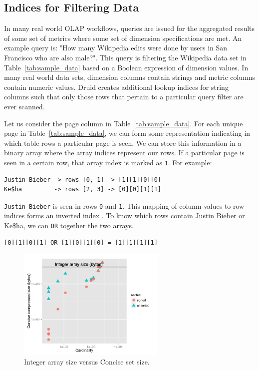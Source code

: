 \documentclass{acm_proc_article-sp}
\begin{document}
\subsection{Indices for Filtering Data}
In many real world OLAP workflows, queries are issued for the aggregated
results of some set of metrics where some set of dimension specifications are
met. An example query is: "How many Wikipedia edits were done by users in
San Francisco who are also male?". This query is filtering the Wikipedia data
set in Table~\ref{tab:sample_data} based on a Boolean expression of dimension
values. In many real world data sets, dimension columns contain strings and
metric columns contain numeric values. Druid creates additional lookup
indices for string columns such that only those rows that pertain to a
particular query filter are ever scanned.

Let us consider the page column in
Table~\ref{tab:sample_data}. For each unique page in
Table~\ref{tab:sample_data}, we can form some representation
indicating in which table rows a particular page is seen. We can
store this information in a binary array where the array indices
represent our rows. If a particular page is seen in a certain
row, that array index is marked as \texttt{1}. For example:
{\small\begin{verbatim}
Justin Bieber -> rows [0, 1] -> [1][1][0][0]
Ke$ha         -> rows [2, 3] -> [0][0][1][1]
\end{verbatim}}

\texttt{Justin Bieber} is seen in rows \texttt{0} and \texttt{1}. This mapping of column values
to row indices forms an inverted index \cite{tomasic1993performance}. To know which
rows contain {\ttfamily Justin Bieber} or {\ttfamily Ke\$ha}, we can \texttt{OR} together
the two arrays.
{\small\begin{verbatim}
[0][1][0][1] OR [1][0][1][0] = [1][1][1][1]
\end{verbatim}}

\begin{figure}
\centering
\includegraphics[width = 2.8in]{concise_plot}
\caption{Integer array size versus Concise set size.}
\label{fig:concise_plot}
\end{figure}
\end{document}
